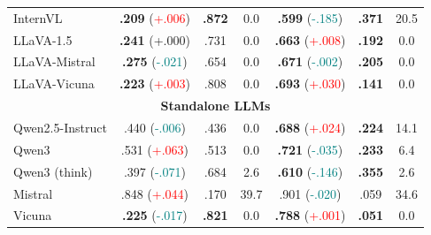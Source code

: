 \begin{table}[t]
\begin{tabular}{lccc@{\hspace{8pt}}ccc}
InternVL      & \textbf{.209} {\scriptsize (\textcolor{red}{+.006})} & \textbf{.872} & 0.0 & \textbf{.599} {\scriptsize (\textcolor{teal}{-.185})} & \textbf{.371} & 20.5 \\
LLaVA-1.5     & \textbf{.241} {\scriptsize (+.000)} & .731 & 0.0 & \textbf{.663} {\scriptsize (\textcolor{red}{+.008})} & \textbf{.192} & 0.0 \\
LLaVA-Mistral & \textbf{.275} {\scriptsize (\textcolor{teal}{-.021})} & .654 & 0.0 & \textbf{.671} {\scriptsize (\textcolor{teal}{-.002})} & \textbf{.205} & 0.0 \\
LLaVA-Vicuna  & \textbf{.223} {\scriptsize (\textcolor{red}{+.003})} & .808 & 0.0 & \textbf{.693} {\scriptsize (\textcolor{red}{+.030})} & \textbf{.141} & 0.0 \\
\midrule
\multicolumn{7}{c}{\textbf{Standalone LLMs}} \\
\midrule
Qwen2.5-Instruct & .440 {\scriptsize (\textcolor{teal}{-.006})} & .436 & 0.0 & \textbf{.688} {\scriptsize (\textcolor{red}{+.024})} & \textbf{.224} & 14.1 \\
Qwen3            & .531 {\scriptsize (\textcolor{red}{+.063})} & .513 & 0.0 & \textbf{.721} {\scriptsize (\textcolor{teal}{-.035})} & \textbf{.233} & 6.4 \\
Qwen3 (think)    & .397 {\scriptsize (\textcolor{teal}{-.071})} & .684 & 2.6 & \textbf{.610} {\scriptsize (\textcolor{teal}{-.146})} & \textbf{.355} & 2.6 \\
Mistral          & .848 {\scriptsize (\textcolor{red}{+.044})} & .170 & 39.7 & .901 {\scriptsize (\textcolor{teal}{-.020})} & .059 & 34.6 \\
Vicuna           & \textbf{.225} {\scriptsize (\textcolor{teal}{-.017})} & \textbf{.821} & 0.0 & \textbf{.788} {\scriptsize (\textcolor{red}{+.001})} & \textbf{.051} & 0.0 \\
\bottomrule
\end{tabular}
\end{table}
